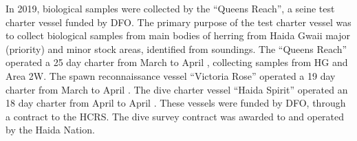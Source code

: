 In 2019, biological samples were collected by the ``Queens Reach'', a seine test charter vessel funded by DFO.
The primary purpose of the test charter vessel was to collect biological samples from main bodies of herring from Haida Gwaii major (priority) and minor stock areas, identiﬁed from soundings.
The ``Queens Reach'' operated a 25 day charter from March  to April , collecting samples from HG and Area 2W.
The spawn reconnaissance vessel ``Victoria Rose'' operated a 19 day charter from March  to April .
The dive charter vessel ``Haida Spirit'' operated an 18 day charter from April  to April .
These vessels were funded by DFO, through a contract to the HCRS.
The dive survey contract was awarded to and operated by the Haida Nation.